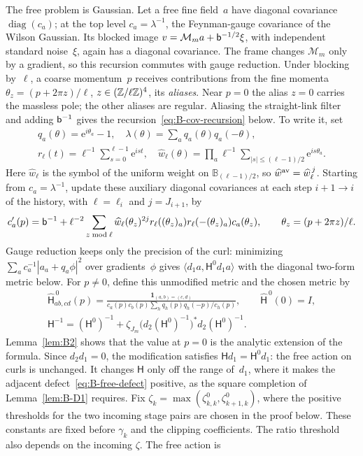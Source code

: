 The free problem is Gaussian. Let a free fine field~$a$ have diagonal covariance $\operatorname{diag}(c_a)$; at the top level $c_a=\lambda^{-1}$, the Feynman-gauge covariance of the Wilson Gaussian. Its blocked image $v=\mathcal M_ma+\mathsf{b}^{-1/2}\xi$, with independent standard noise~$\xi$, again has a diagonal covariance. The frame changes $\mathcal M_m$ only by a gradient, so this recursion commutes with gauge reduction. Under blocking by~$\ell$, a coarse momentum~$p$ receives contributions from the fine momenta $\theta_z=(p+2\pi z)/\ell$, $z\in(\mathbb{Z}/\ell\mathbb{Z})^4$, its \emph{aliases}. Near $p=0$ the alias $z=0$ carries the massless pole; the other aliases are regular. Aliasing the straight-link filter and adding $\mathsf{b}^{-1}$ gives the recursion~\eqref{eq:B-cov-recursion} below. To write it, set
\begin{gather*}
q_a(\theta)=\mathrm e^{i\theta_a}-1,\quad \lambda(\theta)=\sum_aq_a(\theta)q_a(-\theta),\\
r_\ell(t)=\ell^{-1}\sum_{s=0}^{\ell-1}\mathrm e^{ist},\quad
\widehat w_\ell(\theta)=\prod_a \ell^{-1}\sum_{|s|\le(\ell-1)/2}\mathrm e^{is\theta_a}.
\end{gather*}
Here $\widehat w_\ell$ is the symbol of the uniform weight on $\mathbb B_{(\ell-1)/2}$, so $\widehat w^{\rm av}=\widehat w_\ell^{\,j}$. Starting from $c_a=\lambda^{-1}$, update these auxiliary diagonal covariances at each step $i+1\to i$ of the history, with $\ell=\ell_i$ and $j=J_{i+1}$, by
\begin{equation}\label{eq:B-cov-recursion}
c'_a(p)=\mathsf{b}^{-1}+\ell^{-2}\sum_{z\bmod \ell}\widehat w_\ell(\theta_z)^{2j}r_\ell((\theta_z)_a)r_\ell(-(\theta_z)_a)c_a(\theta_z),\qquad \theta_z=(p+2\pi z)/\ell.
\end{equation}
Gauge reduction keeps only the precision of the curl: minimizing $\sum_ac_a^{-1}|a_a+q_a\phi|^2$ over gradients~$\phi$ gives $\langle d_1a,\mathsf H^0d_1a\rangle$ with the diagonal two-form metric below. For $p\ne0$, define this unmodified metric and the chosen metric by
\begin{gather*}
\widehat{\mathsf H}^{\,0}_{ab,cd}(p)=
\frac{\mathbf1_{(a,b)=(c,d)}}{c_a(p)c_b(p)\sum_hq_h(p)q_h(-p)/c_h(p)},\qquad
\widehat{\mathsf H}^{\,0}(0)=I,\\
\mathsf H^{-1}=(\mathsf H^0)^{-1}
 +\zeta_{J_m}\bigl(d_2(\mathsf H^0)^{-1}\bigr)^*d_2(\mathsf H^0)^{-1}.
\end{gather*}
Lemma~\ref{lem:B2} shows that the value at $p=0$ is the analytic extension of the formula. Since $d_2d_1=0$, the modification satisfies $\mathsf Hd_1=\mathsf H^0d_1$: the free action on curls is unchanged. It changes $\mathsf H$ only off the range of~$d_1$, where it makes the adjacent defect~\eqref{eq:B-free-defect} positive, as the square completion of Lemma~\ref{lem:B-D1} requires. Fix $\zeta_k=\max(\zeta^0_{k,k},\zeta^0_{k+1,k})$, where the positive thresholds for the two incoming stage pairs are chosen in the proof below. These constants are fixed before $\gamma_k$ and the clipping coefficients. The ratio threshold also depends on the incoming $\zeta$. The free action is
